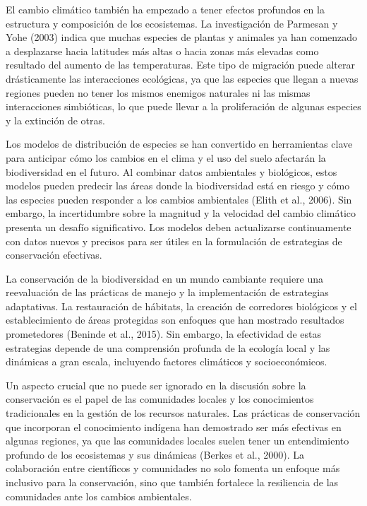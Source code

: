 \documentclass[
  letterpaper,
  DIV=11,
  numbers=noendperiod,
  oneside]{scrreprt}
\begin{document}
El cambio climático también ha empezado a tener efectos profundos en la
estructura y composición de los ecosistemas. La investigación de
Parmesan y Yohe (2003) indica que muchas especies de plantas y animales
ya han comenzado a desplazarse hacia latitudes más altas o hacia zonas
más elevadas como resultado del aumento de las temperaturas. Este tipo
de migración puede alterar drásticamente las interacciones ecológicas,
ya que las especies que llegan a nuevas regiones pueden no tener los
mismos enemigos naturales ni las mismas interacciones simbióticas, lo
que puede llevar a la proliferación de algunas especies y la extinción
de otras.

Los modelos de distribución de especies se han convertido en
herramientas clave para anticipar cómo los cambios en el clima y el uso
del suelo afectarán la biodiversidad en el futuro. Al combinar datos
ambientales y biológicos, estos modelos pueden predecir las áreas donde
la biodiversidad está en riesgo y cómo las especies pueden responder a
los cambios ambientales (Elith et al., 2006). Sin embargo, la
incertidumbre sobre la magnitud y la velocidad del cambio climático
presenta un desafío significativo. Los modelos deben actualizarse
continuamente con datos nuevos y precisos para ser útiles en la
formulación de estrategias de conservación efectivas.

La conservación de la biodiversidad en un mundo cambiante requiere una
reevaluación de las prácticas de manejo y la implementación de
estrategias adaptativas. La restauración de hábitats, la creación de
corredores biológicos y el establecimiento de áreas protegidas son
enfoques que han mostrado resultados prometedores (Beninde et al.,
2015). Sin embargo, la efectividad de estas estrategias depende de una
comprensión profunda de la ecología local y las dinámicas a gran escala,
incluyendo factores climáticos y socioeconómicos.

Un aspecto crucial que no puede ser ignorado en la discusión sobre la
conservación es el papel de las comunidades locales y los conocimientos
tradicionales en la gestión de los recursos naturales. Las prácticas de
conservación que incorporan el conocimiento indígena han demostrado ser
más efectivas en algunas regiones, ya que las comunidades locales suelen
tener un entendimiento profundo de los ecosistemas y sus dinámicas
(Berkes et al., 2000). La colaboración entre científicos y comunidades
no solo fomenta un enfoque más inclusivo para la conservación, sino que
también fortalece la resiliencia de las comunidades ante los cambios
ambientales.
\end{document}
